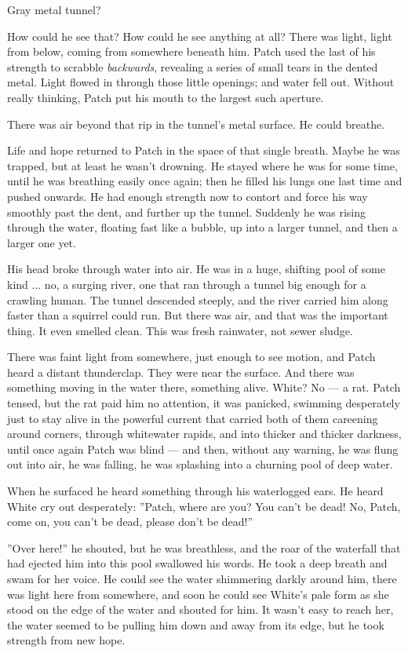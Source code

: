 \documentclass[12pt]{book}
\begin{document}
Gray metal tunnel?

How could he see that? How could he see anything at all? There was light, light from below, coming from somewhere beneath him. Patch used the last of his strength to scrabble {\it backwards}, revealing a series of small tears in the dented metal. Light flowed in through those little openings; and water fell out. Without really thinking, Patch put his mouth to the largest such aperture.

There was air beyond that rip in the tunnel's metal surface. He could breathe.

Life and hope returned to Patch in the space of that single breath. Maybe he was trapped, but at least he wasn't drowning. He stayed where he was for some time, until he was breathing easily once again; then he filled his lungs one last time and pushed onwards. He had enough strength now to contort and force his way smoothly past the dent, and further up the tunnel. Suddenly he was rising through the water, floating fast like a bubble, up into a larger tunnel, and then a larger one yet.

His head broke through water into air. He was in a huge, shifting pool of some kind ... no, a surging river, one that ran through a tunnel big enough for a crawling human. The tunnel descended steeply, and the river carried him along faster than a squirrel could run. But there was air, and that was the important thing. It even smelled clean. This was fresh rainwater, not sewer sludge.

There was faint light from somewhere, just enough to see motion, and Patch heard a distant thunderclap. They were near the surface. And there was something moving in the water there, something alive. White? No ---
a rat. Patch tensed, but the rat paid him no attention, it was panicked, swimming desperately just to stay alive in the powerful current that carried both of them careening around corners, through whitewater rapids, and into thicker and thicker darkness, until once again Patch was blind ---
and then, without any warning, he was flung out into air, he was falling, he was splashing into a churning pool of deep water.

When he surfaced he heard something through his waterlogged ears. He heard White cry out desperately: ''Patch, where are you? You can't be dead! No, Patch, come on, you can't be dead, please don't be dead!''

''Over here!'' he shouted, but he was breathless, and the roar of the waterfall that had ejected him into this pool swallowed his words. He took a deep breath and swam for her voice. He could see the water shimmering darkly around him, there was light here from somewhere, and soon he could see White's pale form as she stood on the edge of the water and shouted for him. It wasn't easy to reach her, the water seemed to be pulling him down and away from its edge, but he took strength from new hope.
\end{document}
